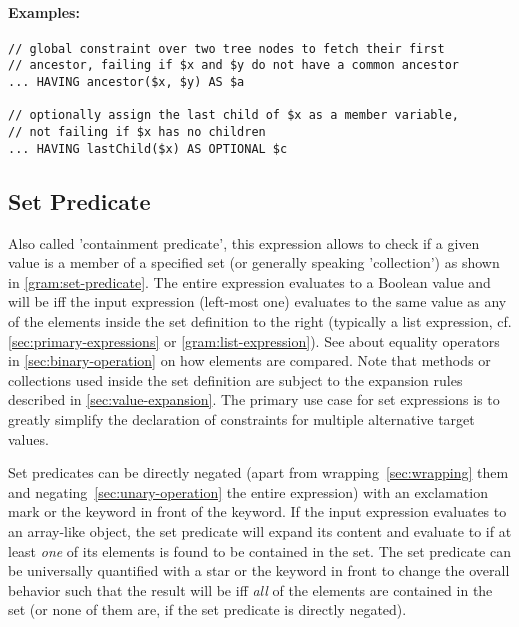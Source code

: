 \documentclass[11pt,a4paper]{report}
\begin{document}
\paragraph{Examples:}
\begin{Verbatim}[samepage=true]
// global constraint over two tree nodes to fetch their first 
// ancestor, failing if $x and $y do not have a common ancestor
... HAVING ancestor($x, $y) AS $a

// optionally assign the last child of $x as a member variable,
// not failing if $x has no children
... HAVING lastChild($x) AS OPTIONAL $c
\end{Verbatim}


\subsection{Set Predicate}
\label{sec:set-predicate}

Also called 'containment predicate', this expression allows to check if a given value is a member of a specified set (or generally speaking 'collection') as shown in \cref{gram:set-predicate}. 
The entire expression evaluates to a Boolean value and will be  iff the input expression (left-most one) evaluates to the same value as any of the elements inside the set definition to the right (typically a list expression, cf. \cref{sec:primary-expressions} or \cref{gram:list-expression}). 
See about equality operators in \cref{sec:binary-operation} on how elements are compared. 
Note that methods or collections used inside the set definition are subject to the expansion rules described in \cref{sec:value-expansion}.
The primary use case for set expressions is to greatly simplify the declaration of constraints for multiple alternative target values. 

Set predicates can be directly negated (apart from wrapping~\ref{sec:wrapping} them and negating~\ref{sec:unary-operation} the entire expression) with an exclamation mark \lit{!} or the keyword  in front of the  keyword. 
If the input expression evaluates to an array-like object, the set predicate will expand its content and evaluate to  if at least \textit{one} of its elements is found to be contained in the set. 
The set predicate can be universally quantified with a star \lit{*} or the  keyword in front to change the overall behavior such that the result will be  iff \textit{all} of the elements are contained in the set (or none of them are, if the set predicate is directly negated).
\end{document}
